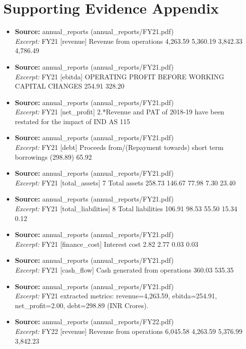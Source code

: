\documentclass[11pt,a4paper]{article}
\begin{document}
\section*{Supporting Evidence Appendix}
\begin{itemize}
\item \textbf{Source:} annual\_reports (annual\_reports/FY21.pdf) \\ \textit{Excerpt:} FY21 [revenue] Revenue from operations 4,263.59 5,360.19 3,842.33 4,786.49
\item \textbf{Source:} annual\_reports (annual\_reports/FY21.pdf) \\ \textit{Excerpt:} FY21 [ebitda] OPERATING PROFIT BEFORE WORKING CAPITAL CHANGES 254.91 328.20
\item \textbf{Source:} annual\_reports (annual\_reports/FY21.pdf) \\ \textit{Excerpt:} FY21 [net\_profit] 2.*Revenue and PAT of 2018-19 have been restated for the impact of IND AS 115
\item \textbf{Source:} annual\_reports (annual\_reports/FY21.pdf) \\ \textit{Excerpt:} FY21 [debt] Proceeds from/(Repayment towards) short term borrowings (298.89) 65.92
\item \textbf{Source:} annual\_reports (annual\_reports/FY21.pdf) \\ \textit{Excerpt:} FY21 [total\_assets] 7 Total assets 258.73 146.67 77.98 7.30 23.40
\item \textbf{Source:} annual\_reports (annual\_reports/FY21.pdf) \\ \textit{Excerpt:} FY21 [total\_liabilities] 8 Total liabilities 106.91 98.53 55.50 15.34 0.12
\item \textbf{Source:} annual\_reports (annual\_reports/FY21.pdf) \\ \textit{Excerpt:} FY21 [finance\_cost] Interest cost 2.82 2.77 0.03 0.03
\item \textbf{Source:} annual\_reports (annual\_reports/FY21.pdf) \\ \textit{Excerpt:} FY21 [cash\_flow] Cash generated from operations 360.03 535.35
\item \textbf{Source:} annual\_reports (annual\_reports/FY21.pdf) \\ \textit{Excerpt:} FY21 extracted metrics: revenue=4,263.59, ebitda=254.91, net\_profit=2.00, debt=298.89 (INR Crores).
\item \textbf{Source:} annual\_reports (annual\_reports/FY22.pdf) \\ \textit{Excerpt:} FY22 [revenue] Revenue from operations 6,045.58 4,263.59 5,376.99 3,842.23

\end{itemize}
\end{document}
